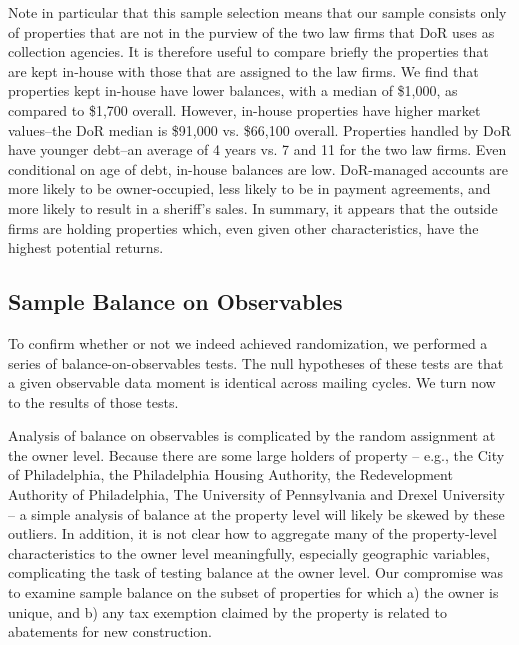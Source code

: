 \documentclass[12pt,titlepage]{article}
\begin{document}
Note in particular that this sample selection means that our sample
consists only of properties that are not in the purview of the two law
firms that DoR uses as collection agencies. It is therefore useful to
compare briefly the properties that are kept in-house with those that
are assigned to the law firms. We find that properties kept in-house
have lower balances, with a median of \$1,000, as compared to \$1,700
overall. However, in-house properties have higher market values--the
DoR median is \$91,000 vs. \$66,100 overall. Properties handled by DoR
have younger debt--an average of 4 years vs. 7 and 11 for the two law
firms.  Even conditional on age of debt, in-house balances are low.
DoR-managed accounts are more likely to be owner-occupied, less likely
to be in payment agreements, and more likely to result in a sheriff's
sales. In summary, it appears that the outside firms are holding
properties which, even given other characteristics, have the highest
potential returns.

\subsection{Sample Balance on Observables}

To confirm whether or not we indeed achieved randomization, we
performed a series of balance-on-observables tests. The null
hypotheses of these tests are that a given observable data moment is
identical across mailing cycles. We turn now to the results of those
tests.

Analysis of balance on observables is complicated by the random
assignment at the owner level.  Because there are some large holders of property -- e.g., the City of Philadelphia, the Philadelphia Housing Authority, the Redevelopment Authority of Philadelphia, The University of Pennsylvania and Drexel University  -- a simple analysis of balance at the property level will likely be skewed
by these outliers. In addition, it is not clear how to aggregate many
of the property-level characteristics to the owner level meaningfully,
especially geographic variables, complicating the task of testing 
balance at the owner level. Our compromise was
to examine sample balance on the subset of properties for which a) the
owner is unique, and b) any tax exemption claimed by the property is
related to abatements for new construction.
  
\end{document}
